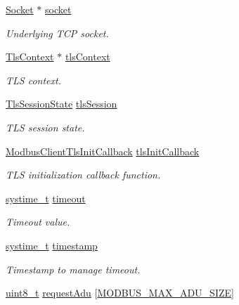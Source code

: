 \begin{DoxyCompactItemize}
\hyperlink{socket_8h_aa85acfb0fa336ef495e6ba87fb88fc48}{Socket} $\ast$ \hyperlink{struct__ModbusClientContext_a80437706d8e54d0d668713d226b0b0c7}{socket}
\begin{DoxyCompactList}\small\item\em Underlying T\+CP socket. \end{DoxyCompactList}\item 
\hyperlink{tls_8h_ac09f7a286c0cdf9b07ee1edd107946f5}{Tls\+Context} $\ast$ \hyperlink{struct__ModbusClientContext_ab438d0f8a9c7282c19e15d4219a6bae8}{tls\+Context}
\begin{DoxyCompactList}\small\item\em T\+LS context. \end{DoxyCompactList}\item 
\hyperlink{structTlsSessionState}{Tls\+Session\+State} \hyperlink{struct__ModbusClientContext_aaa844a2741737a9672ba13dff4e0c21f}{tls\+Session}
\begin{DoxyCompactList}\small\item\em T\+LS session state. \end{DoxyCompactList}\item 
\hyperlink{modbus__client_8h_a3c569366af881058e415a11fb1071050}{Modbus\+Client\+Tls\+Init\+Callback} \hyperlink{struct__ModbusClientContext_a131205592da3ce6b399c1a68b22a0fd8}{tls\+Init\+Callback}
\begin{DoxyCompactList}\small\item\em T\+LS initialization callback function. \end{DoxyCompactList}\item 
\hyperlink{compiler__port_8h_ae3e32a98d431a02106616da3071832dd}{systime\+\_\+t} \hyperlink{struct__ModbusClientContext_a5b0a7d5bcfb0f43f5f177a0e6ae56282}{timeout}
\begin{DoxyCompactList}\small\item\em Timeout value. \end{DoxyCompactList}\item 
\hyperlink{compiler__port_8h_ae3e32a98d431a02106616da3071832dd}{systime\+\_\+t} \hyperlink{struct__ModbusClientContext_adb844f82f7243f6479afba2e8491f558}{timestamp}
\begin{DoxyCompactList}\small\item\em Timestamp to manage timeout. \end{DoxyCompactList}\item 
\hyperlink{stdint_8h_aba7bc1797add20fe3efdf37ced1182c5}{uint8\+\_\+t} \hyperlink{struct__ModbusClientContext_a17a76f9a1bb6891142f7043016a3e90a}{request\+Adu} \mbox{[}\hyperlink{modbus__common_8h_a2c01d2b429ca01511f3f6b8c63edfda8}{M\+O\+D\+B\+U\+S\+\_\+\+M\+A\+X\+\_\+\+A\+D\+U\+\_\+\+S\+I\+ZE}\mbox{]}

\end{DoxyCompactItemize}
